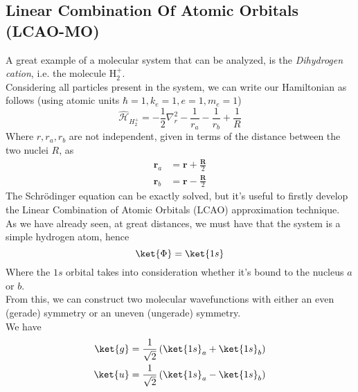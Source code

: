 \documentclass[a4paper, 11pt]{book}
\renewcommand{\vec}[1]{\mathbf{#1}}
\newcommand{\1}{\opr{\mathds{1}}}
\newcommand{\ham}{\mathcal{H}}
\newcommand{\opr}[1]{\hat{#1}}
\theoremstyle{plain}
\begin{document}
	\subsection{Linear Combination Of Atomic Orbitals (LCAO-MO)}
	A great example of a molecular system that can be analyzed, is the \textit{Dihydrogen cation}, i.e. the molecule $\mathrm{H}_2^+$.\\
	Considering all particles present in the system, we can write our Hamiltonian as follows (using atomic units $\hbar=1,k_e=1,e=1,m_e=1$)
	\begin{equation}
		\opr{\ham}_{H_2^+}=-\frac{1}{2}\nabla^2_r-\frac{1}{r_a}-\frac{1}{r_b}+\frac{1}{R}
		\label{eq:h2plusham}
	\end{equation}
	Where $r,r_a,r_b$ are not independent, given in terms of the distance between the two nuclei $R$, as
	\begin{equation*}
		\begin{aligned}
			\vec{r}_a&=\vec{r}+\frac{\vec{R}}{2}\\
			\vec{r}_b&=\vec{r}-\frac{\vec{R}}{2}
		\end{aligned}
	\end{equation*}
	The Schrödinger equation can be exactly solved, but it's useful to firstly develop the Linear Combination of Atomic Orbitals (LCAO) approximation technique.\\
	As we have already seen, at great distances, we must have that the system is a simple hydrogen atom, hence
	\begin{equation*}
		\ket{\Phi}=\ket{1s}
	\end{equation*}
	Where the $1s$ orbital takes into consideration whether it's bound to the nucleus $a$ or $b$.\\
	From this, we can construct two molecular wavefunctions with either an even (gerade) symmetry or an uneven (ungerade) symmetry.\\
	We have
	\begin{equation}
		\begin{aligned}
			\ket{g}&=\frac{1}{\sqrt{2}}\left( \ket{1s}_a+\ket{1s}_b \right)\\
			\ket{u}&=\frac{1}{\sqrt{2}}\left( \ket{1s}_a-\ket{1s}_b \right)
		\end{aligned}
		\label{eq:geradeungeradewfh2plus}
	\end{equation}
\end{document}
